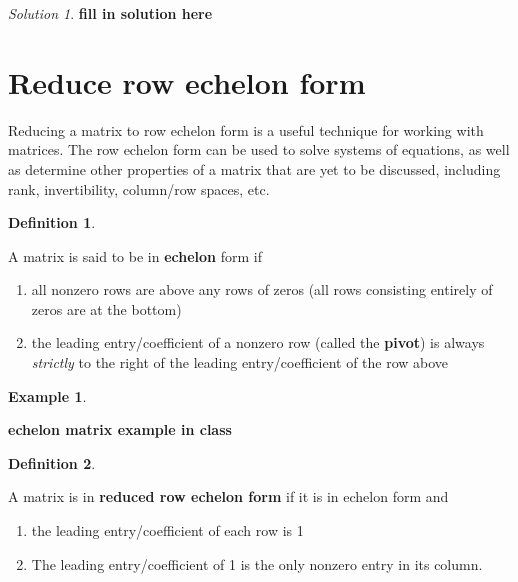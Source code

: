 \documentclass[
]{book}
\theoremstyle{definition}
\newtheorem{definition}{Definition}[chapter]
\theoremstyle{definition}
\newtheorem{example}{Example}[chapter]
\theoremstyle{definition}
\theoremstyle{remark}
\newtheorem*{solution}{Solution}
\begin{document}
\begin{solution}

\textbf{fill in solution here}

\end{solution}

\hypertarget{reduce-row-echelon-form}{%
\section{Reduce row echelon form}\label{reduce-row-echelon-form}}

Reducing a matrix to row echelon form is a useful technique for working with matrices. The row echelon form can be used to solve systems of equations, as well as determine other properties of a matrix that are yet to be discussed, including rank, invertibility, column/row spaces, etc.

\begin{definition}
\protect\hypertarget{def:unlabeled-div-57}{}\label{def:unlabeled-div-57}

A matrix is said to be in \textbf{echelon} form if

\begin{enumerate}
\def\labelenumi{\arabic{enumi})}
\item
  all nonzero rows are above any rows of zeros (all rows consisting entirely of zeros are at the bottom)
\item
  the leading entry/coefficient of a nonzero row (called the \textbf{pivot}) is always \emph{strictly} to the right of the leading entry/coefficient of the row above
\end{enumerate}

\end{definition}

\begin{example}
\protect\hypertarget{exm:unlabeled-div-58}{}\label{exm:unlabeled-div-58}

\textbf{echelon matrix example in class}

\end{example}

\begin{definition}
\protect\hypertarget{def:unlabeled-div-59}{}\label{def:unlabeled-div-59}

A matrix is in \textbf{reduced row echelon form} if it is in echelon form and

\begin{enumerate}
\def\labelenumi{\arabic{enumi})}
\item
  the leading entry/coefficient of each row is 1
\item
  The leading entry/coefficient of 1 is the only nonzero entry in its column.
\end{enumerate}

\end{definition}
\end{document}
